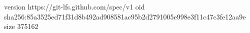 version https://git-lfs.github.com/spec/v1
oid sha256:85a3525ed71f31d8b492ad908581ac95b2d2791005e998e3f11c47c3fe12aa9e
size 375162
